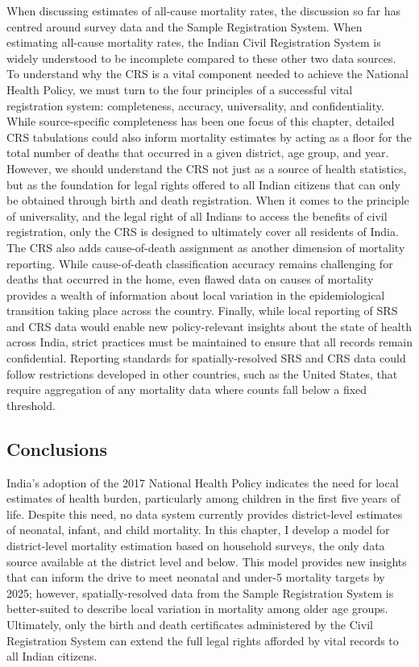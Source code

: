 \documentclass[
]{report}
\begin{document}
When discussing estimates of all-cause mortality rates, the discussion so far has centred around survey data and the Sample Registration System. When estimating all-cause mortality rates, the Indian Civil Registration System is widely understood to be incomplete compared to these other two data sources.\autocite{Gupta2016,Kumar2019} To understand why the CRS is a vital component needed to achieve the National Health Policy, we must turn to the four principles of a successful vital registration system: completeness, accuracy, universality, and confidentiality.\autocite{UnitedNationsStatisticsDivision2014} While source-specific completeness has been one focus of this chapter, detailed CRS tabulations could also inform mortality estimates by acting as a floor for the total number of deaths that occurred in a given district, age group, and year. However, we should understand the CRS not just as a source of health statistics, but as the foundation for legal rights offered to all Indian citizens that can only be obtained through birth and death registration. When it comes to the principle of universality, and the legal right of all Indians to access the benefits of civil registration, only the CRS is designed to ultimately cover all residents of India. The CRS also adds cause-of-death assignment as another dimension of mortality reporting. While cause-of-death classification accuracy remains challenging for deaths that occurred in the home,\autocite{Kotabagi2004} even flawed data on causes of mortality provides a wealth of information about local variation in the epidemiological transition taking place across the country. Finally, while local reporting of SRS and CRS data would enable new policy-relevant insights about the state of health across India, strict practices must be maintained to ensure that all records remain confidential. Reporting standards for spatially-resolved SRS and CRS data could follow restrictions developed in other countries, such as the United States, that require aggregation of any mortality data where counts fall below a fixed threshold.\autocite{Thacker1988}

\hypertarget{conclusions-2}{%
\subsection{Conclusions}\label{conclusions-2}}

India's adoption of the 2017 National Health Policy indicates the need for local estimates of health burden, particularly among children in the first five years of life. Despite this need, no data system currently provides district-level estimates of neonatal, infant, and child mortality. In this chapter, I develop a model for district-level mortality estimation based on household surveys, the only data source available at the district level and below. This model provides new insights that can inform the drive to meet neonatal and under-5 mortality targets by 2025; however, spatially-resolved data from the Sample Registration System is better-suited to describe local variation in mortality among older age groups. Ultimately, only the birth and death certificates administered by the Civil Registration System can extend the full legal rights afforded by vital records to all Indian citizens.
\end{document}
